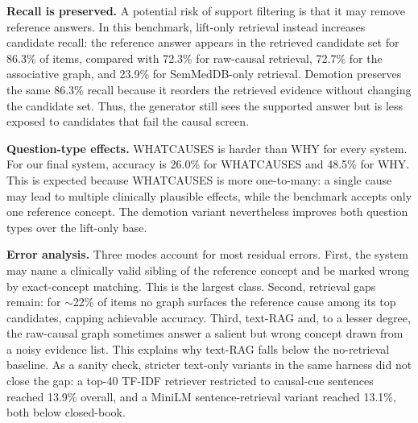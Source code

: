 \documentclass[runningheads]{llncs}
\begin{document}
\smallskip\noindent\textbf{Recall is preserved.}
A potential risk of support filtering is that it may remove reference answers. In this benchmark, lift-only retrieval instead increases candidate recall: the reference answer appears in the retrieved candidate set for 86.3\% of items, compared with 72.3\% for raw-causal retrieval, 72.7\% for the associative graph, and 23.9\% for SemMedDB-only retrieval. Demotion preserves the same 86.3\% recall because it reorders the retrieved evidence without changing the candidate set. Thus, the generator still sees the supported answer but is less exposed to candidates that fail the causal screen.

\smallskip\noindent\textbf{Question-type effects.} WHATCAUSES is harder than WHY for every system. For our final system, accuracy is 26.0\% for WHATCAUSES and 48.5\% for WHY. This is expected because WHATCAUSES is more one-to-many: a single cause may lead to multiple clinically plausible effects, while the benchmark accepts only one reference concept. The demotion variant nevertheless improves both question types over the lift-only base.


\smallskip\noindent\textbf{Error analysis.} Three modes account for most residual errors. First, the system may name a clinically valid sibling of the reference concept and be marked wrong by exact-concept matching. This is the largest class. Second, retrieval gaps remain: for $\sim$22\% of items no graph surfaces the reference cause among its top candidates, capping achievable accuracy. Third, text-RAG and, to a lesser degree, the raw-causal graph sometimes answer a salient but wrong concept drawn from a noisy evidence list. This explains why text-RAG falls below the no-retrieval baseline. As a sanity check, stricter text-only variants in the same harness did not close the gap: a top-40 TF-IDF retriever restricted to causal-cue sentences reached 13.9\% overall, and a MiniLM sentence-retrieval variant reached 13.1\%, both below closed-book.
\end{document}
